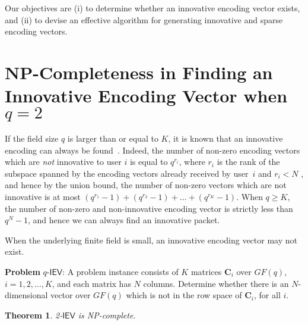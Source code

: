\documentclass[letterpaper,conference,10pt]{IEEEtran}
\newtheorem{theorem}{Theorem}
\begin{document}
Our objectives are  (i) to determine whether an innovative encoding vector exists, and (ii) to devise an effective algorithm for generating innovative and sparse encoding vectors.



\section{NP-Completeness in Finding an Innovative Encoding Vector when $q=2$}
\label{sec:NPhard}

If the field size $q$ is larger than or equal to $K$, it is known that an innovative encoding can always be found~\cite{DFT07}. Indeed, the number of non-zero encoding vectors which are {\em not} innovative to user $i$ is equal to $q^{r_i}$, where $r_i$ is the rank of the subspace spanned by the encoding vectors already received by user~$i$ and $r_i < N$ , and hence by the union bound, the number of non-zero vectors which are not innovative is at most
$  (q^{r_1}-1)+(q^{r_2}-1) + \ldots + (q^{r_K}-1)$.
When $q \geq K$, the number of non-zero and non-innovative encoding vector is strictly less than $q^N-1$, and hence we can always find an innovative packet.

When the underlying finite field is small, an innovative encoding vector may not exist.

{\bf Problem} $q$-$\mathsf{IEV}$: A problem instance consists of $K$ matrices $\mathbf{C}_i$ over $GF(q)$, $i=1,2,\ldots, K$, and each matrix has $N$ columns. Determine whether there is an $N$-dimensional vector over $GF(q)$ which is not in the row space of $\mathbf{C}_i$, for all $i$.

\begin{theorem}
2-$\mathsf{IEV}$ is NP-complete.
\end{theorem}
\end{document}
